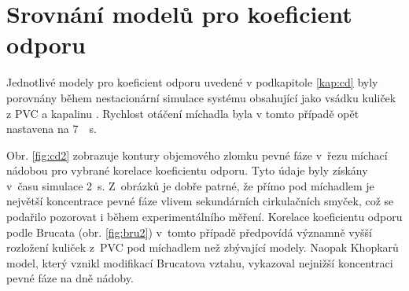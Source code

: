 
\section{Srovnání modelů pro koeficient odporu}
Jednotlivé modely pro koeficient odporu uvedené v podkapitole \ref{kap:cd} byly porovnány během nestacionární simulace systému obsahující jako vsádku  kuliček z PVC a kapalinu \pvpP. Rychlost otáčení míchadla byla v tomto případě opět nastavena na \SI{7}{\per\second}.

Obr. \ref{fig:cd2} zobrazuje kontury objemového zlomku pevné fáze v~řezu míchací nádobou pro vybrané korelace koeficientu odporu. Tyto údaje byly získány v~času simulace \SI{2}{\second}. Z~obrázků je dobře patrné, že přímo pod míchadlem je největší koncentrace pevné fáze vlivem sekundárních cirkulačních smyček, což se podařilo pozorovat i během experimentálního měření. Korelace koeficientu odporu podle Brucata (obr. \ref{fig:bru2}) v~tomto případě předpovídá významně vyšší rozložení kuliček z~PVC pod míchadlem než zbývající modely. Naopak Khopkarů model, který vznikl modifikací Brucatova vztahu, vykazoval nejnižší koncentraci pevné fáze na dně nádoby. 


